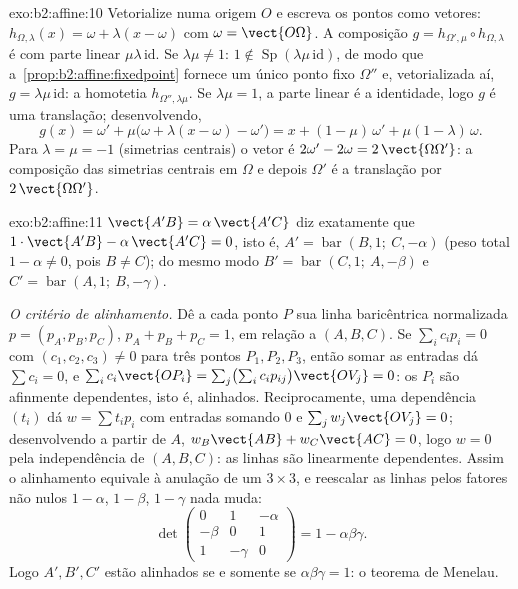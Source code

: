 \begin{solution}{exo:b2:affine:10}
Vetorialize numa origem $O$ e escreva os pontos como vetores:
$h_{\Omega, \lambda}(x) = \omega + \lambda(x - \omega)$ com
$\omega = \vect{O\Omega}$. A composição $g = h_{\Omega',
\mu} \circ h_{\Omega, \lambda}$ é  com parte linear
$\mu\lambda\,\mathrm{id}$. Se $\lambda\mu \neq 1$: $1 \notin
\operatorname{Sp}(\lambda\mu\,\mathrm{id})$, de modo que
a~\cref{prop:b2:affine:fixedpoint} fornece um único ponto fixo
$\Omega''$ e, vetorializada aí, $g =
\lambda\mu\,\mathrm{id}$: a homotetia $h_{\Omega'',
\lambda\mu}$. Se $\lambda\mu = 1$, a parte linear é a
identidade, logo $g$ é uma translação; desenvolvendo,
\[
g(x) = \omega' + \mu\bigl(\omega + \lambda(x - \omega) -
\omega'\bigr) = x + (1 - \mu)\,\omega' + \mu(1 -
\lambda)\,\omega .
\]
Para $\lambda = \mu = -1$ (simetrias centrais) o vetor é
$2\omega' - 2\omega = 2\,\vect{\Omega\Omega'}$: a
composição das simetrias centrais em $\Omega$ e depois
$\Omega'$ é a translação por $2\,\vect{\Omega\Omega'}$.
\end{solution}

\begin{solution}{exo:b2:affine:11}
$\vect{A'B} = \alpha\,\vect{A'C}$ diz exatamente que $1\cdot
\vect{A'B} - \alpha\,\vect{A'C} = 0$, isto é, $A' =
\operatorname{bar}(B, 1;\ C, -\alpha)$ (peso total $1 -
\alpha \neq 0$, pois $B \neq C$); do mesmo modo $B' =
\operatorname{bar}(C, 1;\ A, -\beta)$ e $C' =
\operatorname{bar}(A, 1;\ B, -\gamma)$.

\emph{O critério de alinhamento.} Dê a cada ponto $P$ sua
linha baricêntrica normalizada $p = (p_A, p_B, p_C)$, $p_A + p_B +
p_C = 1$, em relação a $(A, B, C)$. Se $\sum_i c_i p_i = 0$
com $(c_1, c_2, c_3) \neq 0$ para três pontos $P_1, P_2,
P_3$, então somar as entradas dá $\sum c_i = 0$, e
$\sum_i c_i \vect{OP_i} = \sum_j \bigl(\sum_i
c_ip_{ij}\bigr)\vect{OV_j} = 0$: os $P_i$ são afinmente
dependentes, isto é, alinhados. Reciprocamente, uma dependência 
$(t_i)$ dá $w = \sum t_ip_i$ com entradas somando $0$
e $\sum_j w_j\vect{OV_j} = 0$; desenvolvendo a partir de $A$, $w_B
\vect{AB} + w_C\vect{AC} = 0$, logo $w = 0$ pela independência
 de $(A, B, C)$: as linhas são linearmente dependentes.
Assim o alinhamento equivale à anulação de um  $3 \times 3$,
e reescalar as linhas pelos fatores não nulos $1 - \alpha$, $1 -
\beta$, $1 - \gamma$ nada muda:
\[
\det\begin{pmatrix} 0 & 1 & -\alpha\\ -\beta & 0 & 1\\ 1 &
-\gamma & 0\end{pmatrix}
= 1 - \alpha\beta\gamma .
\]
Logo $A', B', C'$ estão alinhados se e somente se $\alpha\beta\gamma = 1$:
o teorema de Menelau.
\end{solution}

